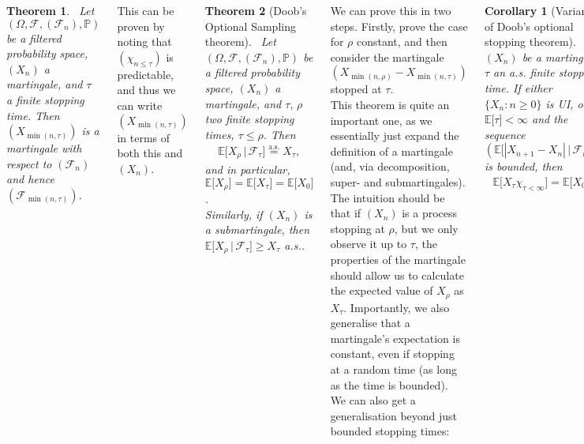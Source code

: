 \documentclass{tikzposter} %
\newtheorem{theorem}{Theorem}
\newtheorem{corollary}{Corollary}
\begin{document}
\begin{columns}
{    \begin{theorem}
    \ Let $(\Omega, \mathcal{F}, (\mathcal{F}_{n}), \mathbb{P})$ be a filtered probability space, $(X_{n})$ a martingale, and $\tau$ a finite stopping time. Then $(X_{\min(n,\tau)})$ is a martingale with respect to $(\mathcal{F}_{n})$ and hence $(\mathcal{F}_{\min(n,\tau)})$.
    \end{theorem}
    \hphantom{}

    This can be proven by noting that $(\chi_{n \le \tau})$ is predictable, and thus we can write $(X_{\min(n,\tau)})$ in terms of both this and $(X_{n})$. \\

    \begin{theorem}[Doob's Optional Sampling theorem]
      \ Let $(\Omega, \mathcal{F}, (\mathcal{F}_{n}), \mathbb{P})$ be a filtered probability space, $(X_{n})$ a martingale, and $\tau,\,\rho$ two finite stopping times, $\tau \le \rho$. Then
      \begin{align*}
        \mathbb{E}\big[X_{\rho} \,|\, \mathcal{F}_{\tau}\big] \overset{\mathrm{a.s.}}{=} X_{\tau},
      \end{align*}
      and in particular, $\mathbb{E}\big[X_{\rho}\big] = \mathbb{E}\big[X_{\tau}\big] = \mathbb{E}\big[X_{0}\big]$. \\

      Similarly, if $(X_{n})$ is a submartingale, then $\mathbb{E}\big[X_{\rho}\,|\, \mathcal{F}_{\tau}\big] \ge X_{\tau}$ a.s..
    \end{theorem}
    \hphantom{}

    We can prove this in two steps. Firstly, prove the case for $\rho$ constant, and then consider the martingale $(X_{\min(n,\rho)}-X_{\min(n,\tau)})$ stopped at $\tau$. \\

    This theorem is quite an important one, as we essentially just expand the definition of a martingale (and, via decomposition, super- and submartingales). The intuition should be that if $(X_{n})$ is a process stopping at $\rho$, but we only observe it up to $\tau$, the properties of the martingale should allow us to calculate the expected value of $X_{\rho}$ as $X_{\tau}$. Importantly, we also generalise that a martingale's expectation is constant, even if stopping at a random time (as long as the time is bounded). \\

    We can also get a generalisation beyond just bounded stopping times:
    \begin{corollary}[Variants of Doob's optional stopping theorem]
      \ Let $(X_{n})$ be a martingale, $\tau$ an a.s. finite stopping time. If either $\{X_{n} : n \ge 0\}$ is UI, or $\mathbb{E}\big[\tau\big] < \infty$ and the sequence $\displaystyle        \left(\mathbb{E}\big[|X_{n+1}-X_{n}| \,\big|\, \mathcal{F}_{n}\big]\right)$ is bounded, then
      \begin{align*}
        \mathbb{E}\big[X_{\tau} \chi_{\tau < \infty}\big] = \mathbb{E}\big[X_{0}\big].
      \end{align*}
    \end{corollary}

}
\end{columns}
\end{document}
